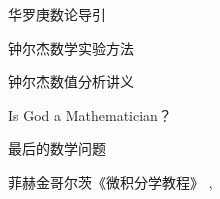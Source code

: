 \documentclass[main.tex]{subfiles}
\begin{document}
华罗庚数论导引
\cite[p.~1]{HuaL}

钟尔杰数学实验方法 \cite{ZhongEr1}

钟尔杰数值分析讲义 \cite{ZhongEr2}

Is God a Mathematician？\cite{LivioM}

最后的数学问题 \cite{LivioM2}

菲赫金哥尔茨《微积分学教程》\cite{FeiH1}
\cite{FeiH2}, \cite{FeiH3}
\end{document}
